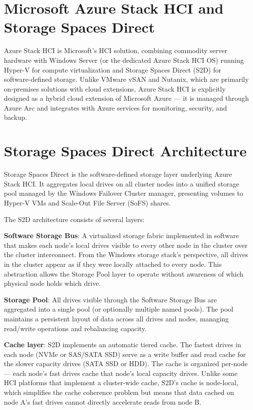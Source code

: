\section{Microsoft Azure Stack HCI and Storage Spaces Direct}
Azure Stack HCI is Microsoft's HCI solution, combining commodity server hardware with Windows Server (or the dedicated Azure Stack HCI OS) running Hyper-V for compute virtualization and Storage Spaces Direct (S2D) for software-defined storage. Unlike VMware vSAN and Nutanix, which are primarily on-premises solutions with cloud extensions, Azure Stack HCI is explicitly designed as a hybrid cloud extension of Microsoft Azure --- it is managed through Azure Arc and integrates with Azure services for monitoring, security, and backup.

\section{Storage Spaces Direct Architecture}
Storage Spaces Direct is the software-defined storage layer underlying Azure Stack HCI. It aggregates local drives on all cluster nodes into a unified storage pool managed by the Windows Failover Cluster manager, presenting volumes to Hyper-V VMs and Scale-Out File Server (SoFS) shares.

The S2D architecture consists of several layers:

\textbf{Software Storage Bus}: A virtualized storage fabric implemented in software that makes each node's local drives visible to every other node in the cluster over the cluster interconnect. From the Windows storage stack's perspective, all drives in the cluster appear as if they were locally attached to every node. This abstraction allows the Storage Pool layer to operate without awareness of which physical node holds which drive.

\textbf{Storage Pool}: All drives visible through the Software Storage Bus are aggregated into a single pool (or optionally multiple named pools). The pool maintains a persistent layout of data across all drives and nodes, managing read/write operations and rebalancing capacity.

\textbf{Cache layer}: S2D implements an automatic tiered cache. The fastest drives in each node (NVMe or SAS/SATA SSD) serve as a write buffer and read cache for the slower capacity drives (SATA SSD or HDD). The cache is organized per-node --- each node's fast drives cache that node's local capacity drives. Unlike some HCI platforms that implement a cluster-wide cache, S2D's cache is node-local, which simplifies the cache coherence problem but means that data cached on node A's fast drives cannot directly accelerate reads from node B.

